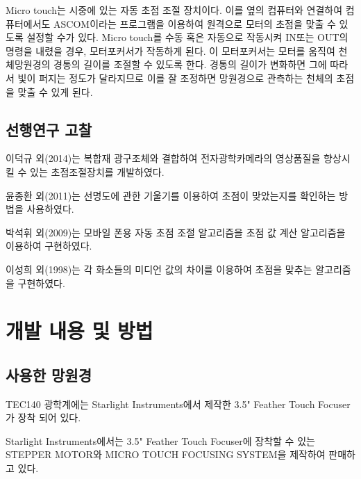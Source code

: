 \documentclass{abstract_hutech}
\begin{document}
Micro touch는 시중에 있는 자동 초점 조절 장치이다. 이를 옆의 컴퓨터와 연결하여 컴퓨터에서도 ASCOM이라는 프로그램을 이용하여 원격으로 모터의 초점을 맞출 수 있도록 설정할 수가 있다. Micro touch를 수동 혹은 자동으로 작동시켜 IN또는 OUT의 명령을 내렸을 경우, 모터포커서가 작동하게 된다. 이 모터포커서는 모터를 움직여 천체망원경의 경통의 길이를 조절할 수 있도록 한다. 경통의 길이가 변화하면 그에 따라서 빛이 퍼지는 정도가 달라지므로 이를 잘 조정하면 망원경으로 관측하는 천체의 초점을 맞출 수 있게 된다.

\subsection{선행연구 고찰}

이덕규 외(2014)는 복합재 광구조체와 결합하여 전자광학카메라의 영상품질을 향상시킬 수 있는 초점조절장치를 개발하였다.\cite{leedukgu2014}

윤종환 외(2011)는 선명도에 관한 기울기를 이용하여 초점이 맞았는지를 확인하는 방법을 사용하였다.\cite{yunjonghwan2011lcd}

박석휘 외(2009)는 모바일 폰용 자동 초점 조절 알고리즘을 초점 값 계산 알고리즘을 이용하여 구현하였다.\cite{parksukhui2009Median}

이성희 외(1998)는 각 화소들의 미디언 값의 차이를 이용하여 초점을 맞추는 알고리즘을 구현하였다.\cite{leeseonghee1998Median}


\section{개발 내용 및 방법}

\subsection{사용한 망원경}

TEC140 광학계에는 Starlight Instruments에서 제작한 3.5" Feather Touch Focuser가 장착 되어 있다. 

Starlight Instruments에서는 3.5" Feather Touch Focuser에 장착할 수 있는 STEPPER MOTOR와 MICRO TOUCH FOCUSING SYSTEM을 제작하여 판매하고 있다. 
\end{document}
